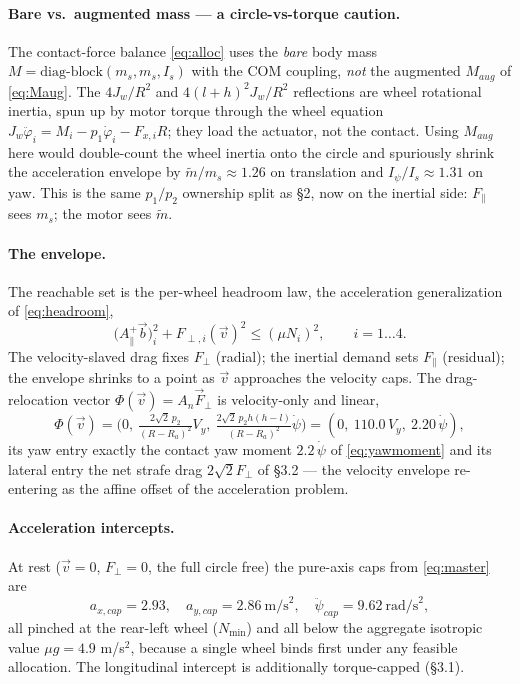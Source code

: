 \documentclass[11pt]{article}
\begin{document}
\paragraph{Bare vs.\ augmented mass --- a circle-vs-torque caution.} The contact-force balance
\eqref{eq:alloc} uses the \emph{bare} body mass $M=\mathrm{diag\text{-}block}(m_s,m_s,I_s)$ with the
COM coupling, \emph{not} the augmented $M_{aug}$ of \eqref{eq:Maug}. The $4J_w/R^2$ and
$4(l+h)^2J_w/R^2$ reflections are wheel rotational inertia, spun up by motor torque through the
wheel equation $J_w\ddot\varphi_i=M_i-p_1\dot\varphi_i-F_{x,i}R$; they load the actuator, not the
contact. Using $M_{aug}$ here would double-count the wheel inertia onto the circle and spuriously
shrink the acceleration envelope by $\tilde m/m_s\approx1.26$ on translation and
$I_\psi/I_s\approx1.31$ on yaw. This is the same $p_1/p_2$ ownership split as \S2, now on the
inertial side: $F_\parallel$ sees $m_s$; the motor sees $\tilde m$.

\paragraph{The envelope.} The reachable set is the per-wheel headroom law, the acceleration
generalization of \eqref{eq:headroom},
\begin{equation}
\boxed{\;\big(A_\parallel^{+}\vec b\big)_i^2+F_{\perp,i}(\vec v)^2\le(\mu N_i)^2,\qquad i=1\ldots4.\;}
\label{eq:master}
\end{equation}
The velocity-slaved drag fixes $F_\perp$ (radial); the inertial demand sets $F_\parallel$
(residual); the envelope shrinks to a point as $\vec v$ approaches the velocity caps. The
drag-relocation vector $\Phi(\vec v)=A_n\vec F_\perp$ is velocity-only and linear,
\begin{equation}
\Phi(\vec v)=\Big(0,\ \tfrac{2\sqrt2\,p_2}{(R-R_a)^2}V_y,\ \tfrac{2\sqrt2\,p_2h(h-l)}{(R-R_a)^2}\dot\psi\Big)
=(0,\ 110.0\,V_y,\ 2.20\,\dot\psi),
\end{equation}
its yaw entry exactly the contact yaw moment $2.2\,\dot\psi$ of \eqref{eq:yawmoment} and its lateral
entry the net strafe drag $2\sqrt2 F_\perp$ of \S3.2 --- the velocity envelope re-entering as the
affine offset of the acceleration problem.

\paragraph{Acceleration intercepts.} At rest ($\vec v=0$, $F_\perp=0$, the full circle free) the
pure-axis caps from \eqref{eq:master} are
\begin{equation}
a_{x,cap}=2.93,\quad a_{y,cap}=2.86\ \text{m/s}^2,\quad \ddot\psi_{cap}=9.62\ \text{rad/s}^2,
\end{equation}
all pinched at the rear-left wheel ($N_{\min}$) and all below the aggregate isotropic value
$\mu g=4.9$ m/s$^2$, because a single wheel binds first under any feasible allocation. The
longitudinal intercept is additionally torque-capped (\S3.1).
\end{document}

